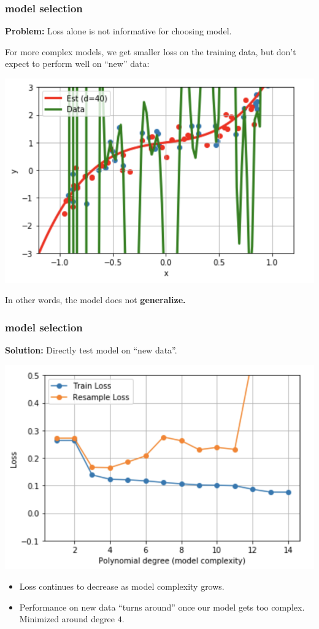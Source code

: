 \documentclass[handout,compress]{beamer}
\begin{document}
\begin{frame}
	\frametitle{model selection}
	\textbf{Problem:} Loss alone is not informative for choosing model.
	
	For more complex models, we get smaller loss on the training data, but don't expect to perform well on ``new'' data:
	\begin{center}
		\includegraphics[width=.5\textwidth]{newdata.png}
	\end{center}

In other words, the model does not \alert{\textbf{generalize.}}
	
\end{frame}

\begin{frame}
	\frametitle{model selection}
	\textbf{Solution:} Directly test model on ``new data''.
	
	\begin{center}
		\includegraphics[width=.6\textwidth]{generalization.png}
	\end{center}
\begin{itemize}
	\item Loss continues to decrease as model complexity grows.
	\item Performance on new data ``turns around'' once our model gets too complex. Minimized around degree $4$.
\end{itemize}
\end{frame}
\end{document}
